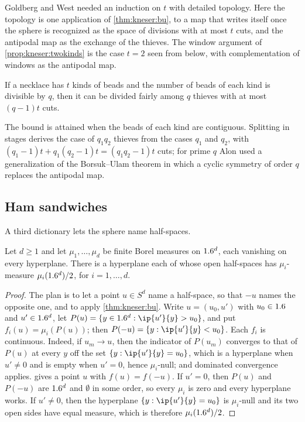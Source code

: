 \begin{refsection}
Goldberg and West needed an induction on $t$ with detailed topology. Here the topology is one application of \cref{thm:kneser:bu}, to a map that writes itself once the sphere is recognized as the space of divisions with at most $t$ cuts, and the antipodal map as the exchange of the thieves. The window argument of \cref{prop:kneser:twokinds} is the case $t=2$ seen from below, with complementation of windows as the antipodal map.

\begin{theorem}\label{thm:kneser:alon}
If a necklace has $t$ kinds of beads and the number of beads of each kind is divisible by $q$, then it can be divided fairly among $q$ thieves with at most $(q-1)t$ cuts.
\end{theorem}

The bound is attained when the beads of each kind are contiguous. Splitting in stages derives the case of $q_1q_2$ thieves from the cases $q_1$ and $q_2$, with $(q_1-1)t+q_1(q_2-1)t=(q_1q_2-1)t$ cuts; for prime $q$ Alon used a generalization of the Borsuk--Ulam theorem in which a cyclic symmetry of order $q$ replaces the antipodal map.

\subsection{Ham sandwiches}

A third dictionary lets the sphere name half-spaces.

\begin{theorem}\label{thm:kneser:ham}
Let $d\ge1$ and let $\mu_1,\dots,\mu_d$ be finite Borel measures on $1.6^d$, each vanishing on every hyperplane. There is a hyperplane each of whose open half-spaces has $\mu_i$-measure $\mu_i(1.6^d)/2$, for $i=1,\dots,d$.
\end{theorem}

\begin{proof}
The plan is to let a point $u\in S^d$ name a half-space, so that $-u$ names the opposite one, and to apply \cref{thm:kneser:bu}. Write $u=(u_0,u')$ with $u_0\in1.6$ and $u'\in1.6^d$, let $P(u)=\{y\in\R^d:\ip{u'}{y}>u_0\}$, and put $f_i(u)=\mu_i(P(u))$; then $P(-u)=\{y:\ip{u'}{y}<u_0\}$. Each $f_i$ is continuous. Indeed, if $u_m\to u$, then the indicator of $P(u_m)$ converges to that of $P(u)$ at every $y$ off the set $\{y:\ip{u'}{y}=u_0\}$, which is a hyperplane when $u'\ne0$ and is empty when $u'=0$, hence $\mu_i$-null; and dominated convergence applies.  gives a point $u$ with $f(u)=f(-u)$. If $u'=0$, then $P(u)$ and $P(-u)$ are $1.6^d$ and $\emptyset$ in some order, so every $\mu_i$ is zero and every hyperplane works. If $u'\ne0$, then the hyperplane $\{y:\ip{u'}{y}=u_0\}$ is $\mu_i$-null and its two open sides have equal measure, which is therefore $\mu_i(1.6^d)/2$.
\end{proof}


\end{refsection}
